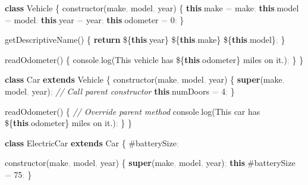 \documentclass[
  justified,
  openright,
]{tufte-book}
\newcommand{\KeywordTok}[1]{\textcolor{CodeKeyword}{\textbf{#1}}}  %
\newcommand{\StringTok}[1]{\textcolor{CodeString}{#1}}              %
\newcommand{\CommentTok}[1]{\textcolor{CodeComment}{\textit{#1}}}  %
\newcommand{\CodeNumTok}[1]{\textcolor{CodeNumber}{#1}}             %
\newcommand{\CodeFuncTok}[1]{\textcolor{CodeKeyword}{#1}}           %
\newcommand{\CodeTypeTok}[1]{\textcolor{CodeType}{#1}}              %
\newcommand{\OperatorTok}[1]{\textcolor{DarkGray}{#1}}              %
\newenvironment{Shaded}{%
  \begin{mdframed}[style=TufteCode]%
}{%
  \end{mdframed}%
}
\begin{document}
\begin{Shaded}
\begin{Highlighting}[]
\KeywordTok{class} Vehicle \{
  \CodeFuncTok{constructor}(make\OperatorTok{,} model\OperatorTok{,} year) \{
    \KeywordTok{this}\OperatorTok{.}\CodeTypeTok{make} \OperatorTok{=} make\OperatorTok{;}
    \KeywordTok{this}\OperatorTok{.}\CodeTypeTok{model} \OperatorTok{=} model\OperatorTok{;}
    \KeywordTok{this}\OperatorTok{.}\CodeTypeTok{year} \OperatorTok{=} year\OperatorTok{;}
    \KeywordTok{this}\OperatorTok{.}\CodeTypeTok{odometer} \OperatorTok{=} \CodeNumTok{0}\OperatorTok{;}
  \}
 
  \CodeFuncTok{getDescriptiveName}() \{
    \KeywordTok{return} \StringTok{\textasciigrave{}}\StringTok{\$\{}\KeywordTok{this}\OperatorTok{.}\CodeTypeTok{year}\StringTok{\}}\StringTok{ }\StringTok{\$\{}\KeywordTok{this}\OperatorTok{.}\CodeTypeTok{make}\StringTok{\}}\StringTok{ }\StringTok{\$\{}\KeywordTok{this}\OperatorTok{.}\CodeTypeTok{model}\StringTok{\}}\StringTok{\textasciigrave{}}\OperatorTok{;}
  \}
 
  \CodeFuncTok{readOdometer}() \{
    console\OperatorTok{.}\CodeFuncTok{log}(\StringTok{\textasciigrave{}This vehicle has }\StringTok{\$\{}\KeywordTok{this}\OperatorTok{.}\CodeTypeTok{odometer}\StringTok{\}}\StringTok{ miles on it.\textasciigrave{}})\OperatorTok{;}
  \}
\}
 
\KeywordTok{class} Car \KeywordTok{extends} Vehicle \{
  \CodeFuncTok{constructor}(make\OperatorTok{,} model\OperatorTok{,} year) \{
    \KeywordTok{super}(make\OperatorTok{,} model\OperatorTok{,} year)\OperatorTok{;} \CommentTok{// Call parent constructor}
    \KeywordTok{this}\OperatorTok{.}\CodeTypeTok{numDoors} \OperatorTok{=} \CodeNumTok{4}\OperatorTok{;}
  \}
 
  \CodeFuncTok{readOdometer}() \{
    \CommentTok{// Override parent method}
    console\OperatorTok{.}\CodeFuncTok{log}(\StringTok{\textasciigrave{}This car has }\StringTok{\$\{}\KeywordTok{this}\OperatorTok{.}\CodeTypeTok{odometer}\StringTok{\}}\StringTok{ miles on it.\textasciigrave{}})\OperatorTok{;}
  \}
\}
 
\KeywordTok{class} ElectricCar \KeywordTok{extends} Car \{
  \#batterySize\OperatorTok{;}
 
  \CodeFuncTok{constructor}(make\OperatorTok{,} model\OperatorTok{,} year) \{
    \KeywordTok{super}(make\OperatorTok{,} model\OperatorTok{,} year)\OperatorTok{;}
    \KeywordTok{this}\OperatorTok{.}\#\CodeTypeTok{batterySize} \OperatorTok{=} \CodeNumTok{75}\OperatorTok{;}
  \}
 

\end{Highlighting}
\end{Shaded}
\end{document}
